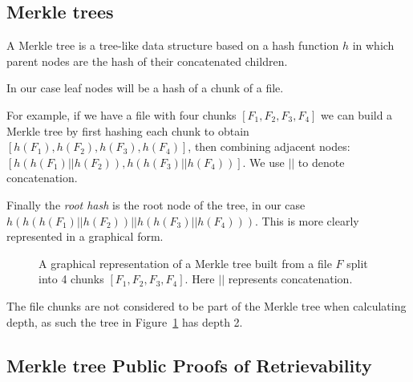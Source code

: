 \documentclass[12pt,a4paper,twoside,openright]{report}
\begin{document}
\subsection{Merkle trees}

A Merkle tree is a tree-like data structure based on a hash function $h$ in which parent nodes are the hash of their concatenated children.

In our case leaf nodes will be a hash of a chunk of a file.

For example, if we have a file with four chunks $[F_1, F_2, F_3, F_4]$ we can build a Merkle tree by first hashing each chunk to obtain
$[h(F_1), h(F_2), h(F_3), h(F_4)]$, then combining adjacent nodes:
$[h(h(F_1) || h(F_2)), h(h(F_3) || h(F_4))]$.
We use $||$ to denote concatenation.

Finally the \textit{root hash} is the root node of the tree, in our case $h(h(h(F_1) || h(F_2)) || h(h(F_3) || h(F_4)))$.
This is more clearly represented in a graphical form.

\begin{figure}[h]
\centering
{}
\caption[A Merkle Tree]{ A graphical representation of a Merkle tree built from a file $F$ split into 4 chunks $[F_1, F_2, F_3, F_4]$.
Here $||$ represents concatenation.}
\label{Merkle example}
\end{figure}

The file chunks are not considered to be part of the Merkle tree when calculating depth, as such the tree in Figure~\ref{Merkle example} has depth 2.



\subsection{Merkle tree Public Proofs of Retrievability}
\end{document}

